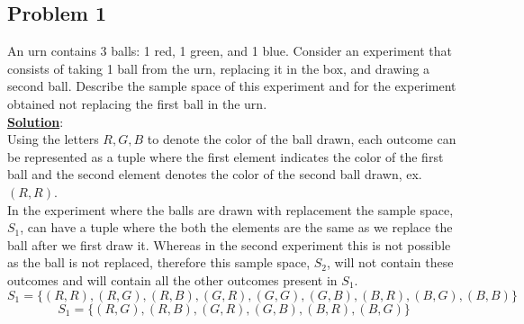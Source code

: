 \documentclass[11pt,letter paper]{report}
\begin{document}
\subsection*{Problem 1}
An urn contains 3 balls: 1 red, 1 green, and 1 blue. Consider an experiment that consists of taking 1 ball from the urn, replacing it in the box, and drawing a second ball. Describe the sample space of this experiment and for the experiment obtained not replacing the first ball in the urn.\\[0.1cm]
{\bf \underline{Solution}}:\\
Using the letters $R,G,B$ to denote the color of the ball drawn, each outcome can be represented as a tuple where the first element indicates the color of the first ball and the second element denotes the color of the second ball drawn, ex. $(R,R)$.\\
In the experiment where the balls are drawn with replacement the sample space, $S_1$, can have a tuple where the both the elements are the same as we replace the ball after we first draw it. Whereas in the second experiment this is not possible as the ball is not replaced, therefore this sample space, $S_2$, will not contain these outcomes and will contain all the other outcomes present in $S_1$.
$$S_1=\lbrace(R,R),(R,G),(R,B),(G,R),(G,G),(G,B),(B,R),(B,G),(B,B)\rbrace$$
$$S_1=\lbrace(R,G),(R,B),(G,R),(G,B),(B,R),(B,G)\rbrace$$


\end{document}
